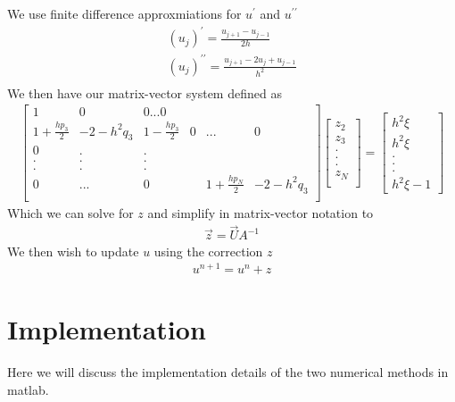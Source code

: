 \documentclass{article}
\begin{document}
\begin{enumerate}
We use finite difference approxmiations for $u^\prime$ and $u^{\prime\prime}$
\begin{align}
(u_j)^\prime = \frac{u_{j+1} - u_{j-1}}{2h} \\
(u_j)^{\prime\prime} = \frac{u_{j+1} - 2u_{j} + u_{j-1}}{h^2} \\
\end{align}
We then have our matrix-vector system defined as
\begin{align}
\begin{bmatrix}
1 & 0 & 0 ... 0 \\
1 + \frac{hp_3}{2} & -2 - h^2q_3 & 1 - \frac{hp_3}{2} & 0 &...& 0\\
0 & . & . \\
. & . & . \\
. & . & . \\
0 & ... &0 & & 1 + \frac{hp_N}{2} & -2 - h^2q_3 \\
\end{bmatrix}
\begin{bmatrix}
z_2 \\ z_3 \\ . \\ . \\ . \\ z_N\\
\end{bmatrix}
=
\begin{bmatrix}
h^2 \xi \\
h^2 \xi \\
. \\
. \\
. \\
h^2 \xi - 1
\end{bmatrix}
\end{align}
Which we can solve for $z$ and simplify in matrix-vector notation to
\begin{align}
\vec{z} = \vec{U} A^{-1} 
\end{align}
We then wish to update $u$ using the correction $z$
\begin{align}
u^{n + 1} = u^{n} + z
\end{align}
\end{enumerate}
\section{Implementation}
Here we will discuss the implementation details of the two numerical methods in matlab. \\
\end{document}
